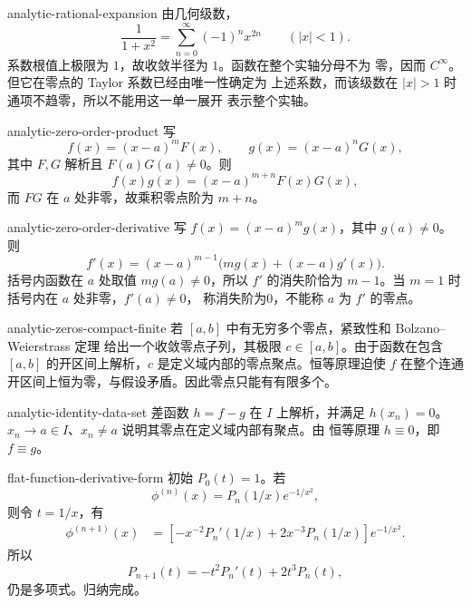\begin{solution}{analytic-rational-expansion}
由几何级数，
\[
 \frac1{1+x^2}
 =\sum_{n=0}^\infty(-1)^nx^{2n}
 \qquad(|x|<1).
\]
系数根值上极限为 \(1\)，故收敛半径为 \(1\)。函数在整个实轴分母不为
零，因而 \(C^\infty\)。但它在零点的 Taylor 系数已经由唯一性确定为
上述系数，而该级数在 \(|x|>1\) 时通项不趋零，所以不能用这一单一展开
表示整个实轴。
\end{solution}

\begin{solution}{analytic-zero-order-product}
写
\[
 f(x)=(x-a)^mF(x),\qquad
 g(x)=(x-a)^nG(x),
\]
其中 \(F,G\) 解析且 \(F(a)G(a)\ne0\)。则
\[
 f(x)g(x)=(x-a)^{m+n}F(x)G(x),
\]
而 \(FG\) 在 \(a\) 处非零，故乘积零点阶为 \(m+n\)。
\end{solution}

\begin{solution}{analytic-zero-order-derivative}
写 \(f(x)=(x-a)^mg(x)\)，其中 \(g(a)\ne0\)。则
\[
 f'(x)=(x-a)^{m-1}
 \bigl(mg(x)+(x-a)g'(x)\bigr).
\]
括号内函数在 \(a\) 处取值 \(mg(a)\ne0\)，所以 \(f'\) 的消失阶恰为
\(m-1\)。当 \(m=1\) 时括号内在 \(a\) 处非零，\(f'(a)\ne0\)，
称消失阶为0，不能称 \(a\) 为 \(f'\) 的零点。
\end{solution}

\begin{solution}{analytic-zeros-compact-finite}
若 \([a,b]\) 中有无穷多个零点，紧致性和 Bolzano--Weierstrass 定理
给出一个收敛零点子列，其极限 \(c\in[a,b]\)。由于函数在包含
\([a,b]\) 的开区间上解析，\(c\) 是定义域内部的零点聚点。恒等原理迫使
\(f\) 在整个连通开区间上恒为零，与假设矛盾。因此零点只能有有限多个。
\end{solution}

\begin{solution}{analytic-identity-data-set}
差函数 \(h=f-g\) 在 \(I\) 上解析，并满足 \(h(x_n)=0\)。
\(x_n\to a\in I\)、\(x_n\ne a\) 说明其零点在定义域内部有聚点。由
恒等原理 \(h\equiv0\)，即 \(f\equiv g\)。
\end{solution}

\begin{solution}{flat-function-derivative-form}
初始 \(P_0(t)=1\)。若
\[
 \phi^{(n)}(x)=P_n(1/x)e^{-1/x^2},
\]
则令 \(t=1/x\)，有
\[
\begin{aligned}
 \phi^{(n+1)}(x)
 &=\left[-x^{-2}P_n'(1/x)+2x^{-3}P_n(1/x)\right]e^{-1/x^2}.
\end{aligned}
\]
所以
\[
 P_{n+1}(t)=-t^2P_n'(t)+2t^3P_n(t),
\]
仍是多项式。归纳完成。
\end{solution}

